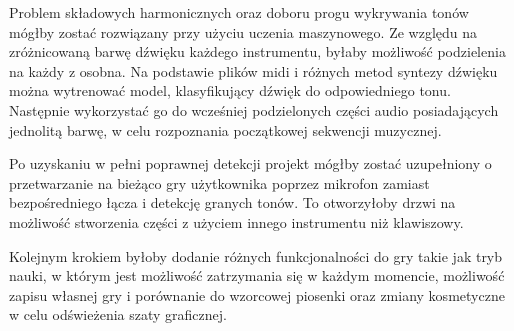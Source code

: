 Problem składowych harmonicznych oraz doboru progu wykrywania tonów mógłby zostać rozwiązany przy użyciu uczenia maszynowego. Ze względu na zróżnicowaną barwę dźwięku każdego instrumentu, byłaby możliwość podzielenia na każdy z osobna. Na podstawie plików midi i różnych metod syntezy dźwięku można wytrenować model, klasyfikujący dźwięk do odpowiedniego tonu. Następnie wykorzystać go do wcześniej podzielonych części audio posiadających jednolitą barwę, w celu rozpoznania początkowej sekwencji muzycznej.

Po uzyskaniu w pełni poprawnej detekcji projekt mógłby zostać uzupełniony o przetwarzanie na bieżąco gry użytkownika poprzez mikrofon zamiast bezpośredniego łącza i detekcję granych tonów. To otworzyłoby drzwi na możliwość stworzenia części z użyciem innego instrumentu niż klawiszowy.

Kolejnym krokiem byłoby dodanie różnych funkcjonalności do gry takie jak tryb nauki, w którym jest możliwość zatrzymania się w każdym momencie, możliwość zapisu własnej gry i porównanie do wzorcowej piosenki oraz zmiany kosmetyczne w celu odświeżenia szaty graficznej.
